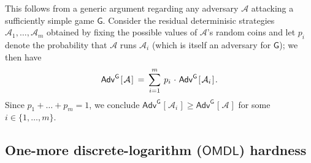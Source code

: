 \documentclass{iacrtrans}
\begin{document}
\begin{rem}
\noindent
This follows from a generic argument
regarding any adversary $\mathcal{A}$
attacking a sufficiently simple game $\mathsf{G}$.
Consider the residual determinisic strategies
$\mathcal{A}_1, \dots, \mathcal{A}_m$ obtained
by fixing the possible values of $\mathcal{A}$'s
random coins and let $p_i$ denote the probability that
$\mathcal{A}$ runs $\mathcal{A}_i$
(which is itself an adversary for $\mathsf{G}$);
we then have
\vspace{0pt}
\begin{equation*}
	\mathsf{Adv}
		^{\mathsf{G}}
		\hspace{1pt}
		[
			\hspace{1pt}
			\mathcal{A}
			\hspace{1pt}
		]
	\hspace{2pt}
	=
	\hspace{2pt}
	\sum_{i=1}^m
	\hspace{2pt}
	p_i
	\hspace{1pt}
	\cdot
	\hspace{1pt}
	\mathsf{Adv}
		^{\mathsf{G}}
		\hspace{1pt}
		[
			\hspace{1pt}
			\mathcal{A}_i
			\hspace{1pt}
		]\hspace{1pt}.
\vspace{0pt}
\end{equation*}
Since $p_1 + \dots + p_m = 1$, we conclude
$
\mathsf{Adv}
	^{\mathsf{G}}
	\hspace{1pt}
	[
		\hspace{1pt}
		\mathcal{A}_i
		\hspace{1pt}
	]
\ge
\mathsf{Adv}
	^{\mathsf{G}}
	\hspace{1pt}
	[
		\hspace{1pt}
		\mathcal{A}
		\hspace{1pt}
	]
$
for some $i \in \{1, \dots, m\}$.
\end{rem}

\subsection{One-more discrete-logarithm ($\mathsf{OMDL}$) hardness}\label{section_omdl_hardness}
\end{document}
